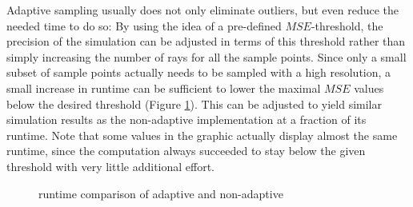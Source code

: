 Adaptive sampling usually does not only eliminate outliers, but even reduce the
needed time to do so: By using the idea of a pre-defined $MSE$-threshold, the
precision of the simulation can be adjusted in terms of this threshold rather than
simply increasing the number of rays for all the sample points. Since only a
small subset of sample points actually needs to be sampled with a high
resolution, a small increase in runtime can be sufficient to lower the maximal
$MSE$ values below the desired threshold (Figure \ref{plot:adaptive_runtime}).
This can be adjusted to yield similar simulation results as the non-adaptive
implementation at a fraction of its runtime. Note that some values in the
graphic actually display almost the same runtime, since the computation always
succeeded to stay below the given threshold with very little additional effort.
\begin{figure}[H]
  \centerline{
    }
  \caption{runtime comparison of adaptive and non-adaptive }
  \label{plot:adaptive_runtime}
\end{figure}

